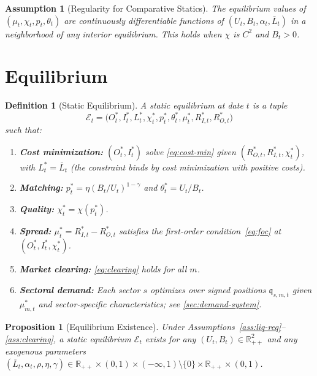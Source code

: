 \documentclass[12pt]{article}
\newtheorem{proposition}{Proposition}
\newtheorem{definition}{Definition}
\newtheorem{assumption}{Assumption}
\theoremstyle{definition}
\newcommand{\1}[1]{\mathds{1}\left[#1\right]}
\newcommand{\R}{\mathbb{R}}
\begin{document}
\begin{assumption}[Regularity for Comparative Statics]
  \label{ass:regularity}
  The equilibrium values of $(\mu_t, \chi_t, p_t, \theta_t)$ are continuously
  differentiable functions of $(U_t, B_t, \alpha_t, \bar{L}_t)$ in a neighborhood
  of any interior equilibrium. This holds when $\chi$ is $C^2$ and $B_t > 0$.
\end{assumption}

\section{Equilibrium}
\label{sec:equilibrium}

\begin{definition}[Static Equilibrium]
  \label{def:equilibrium}
  A \emph{static equilibrium} at date $t$ is a tuple
  \[
    \mathcal{E}_t = \bigl(O_t^*, I_t^*, L_t^*, \chi_t^*, p_t^*, \theta_t^*,
    \mu_t^*, R_{I,t}^*, R_{O,t}^*\bigr)
  \]
  such that:
  \begin{enumerate}[label=(\roman*)]
    \item \textbf{Cost minimization:} $(O_t^*, I_t^*)$ solve
          \eqref{eq:cost-min} given $(R_{O,t}^*, R_{I,t}^*, \chi_t^*)$, with
          $L_t^* = \bar{L}_t$ (the constraint binds by cost minimization with
          positive costs).
    \item \textbf{Matching:} $p_t^* = \eta(B_t/U_t)^{1-\gamma}$ and
          $\theta_t^* = U_t/B_t$.
    \item \textbf{Quality:} $\chi_t^* = \chi(p_t^*)$.
    \item \textbf{Spread:} $\mu_t^* = R_{I,t}^* - R_{O,t}^*$ satisfies the
          first-order condition~\eqref{eq:foc} at $(O_t^*, I_t^*, \chi_t^*)$.
    \item \textbf{Market clearing:} \eqref{eq:clearing} holds for all $m$.
    \item \textbf{Sectoral demand:} Each sector $s$ optimizes over signed
          positions $\mathfrak{q}_{s,m,t}$ given $\mu_{m,t}^*$ and sector-specific
          characteristics; see \cref{sec:demand-system}.
  \end{enumerate}
\end{definition}

\begin{proposition}[Equilibrium Existence]
  \label{prop:existence}
  Under Assumptions~\ref{ass:liq-req}--\ref{ass:clearing}, a static equilibrium
  $\mathcal{E}_t$ exists for any $(U_t, B_t) \in \R_{++}^2$ and any exogenous
  parameters $(\bar{L}_t, \alpha_t, \rho, \eta, \gamma) \in \R_{++} \times
  (0,1) \times (-\infty,1)\setminus\{0\} \times \R_{++} \times (0,1)$.
\end{proposition}
\end{document}
